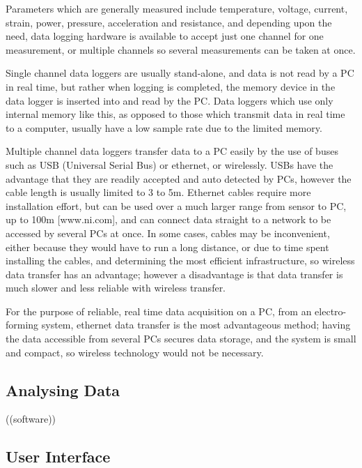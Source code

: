 Parameters which are generally measured include temperature, voltage, current, strain, power, pressure, acceleration and resistance, and depending upon the need, data logging hardware is available to accept just one channel for one measurement, or multiple channels so several measurements can be taken at once. 

Single channel data loggers are usually stand-alone, and data is not read by a PC in real time, but rather when logging is completed, the memory device in the data logger is inserted into and read by the PC. Data loggers which use only internal memory like this, as opposed to those which transmit data in real time to a computer, usually have a low sample rate due to the limited memory.

Multiple channel data loggers transfer data to a PC easily by the use of buses such as USB (Universal Serial Bus) or ethernet, or wirelessly. USBs have the advantage that they are readily accepted and auto detected by PCs, however the cable length is usually limited to 3 to 5m. Ethernet cables require more installation effort, but can be used over a much larger range from sensor to PC, up to 100m [www.ni.com], and can connect data straight to a network to be accessed by several PCs at once. In some cases, cables may be inconvenient, either because they would have to run a long distance, or due to time spent installing the cables, and determining the most efficient infrastructure, so wireless data transfer has an advantage; however a disadvantage is that data transfer is much slower and less reliable with wireless transfer.

For the purpose of reliable, real time data acquisition on a PC, from an electro-forming system, ethernet data transfer is the most advantageous method; having the data accessible from several PCs secures data storage, and the system is small and compact, so wireless technology would not be necessary. 
 
\subsection{Analysing Data}  ((software))

\subsection{User Interface}

